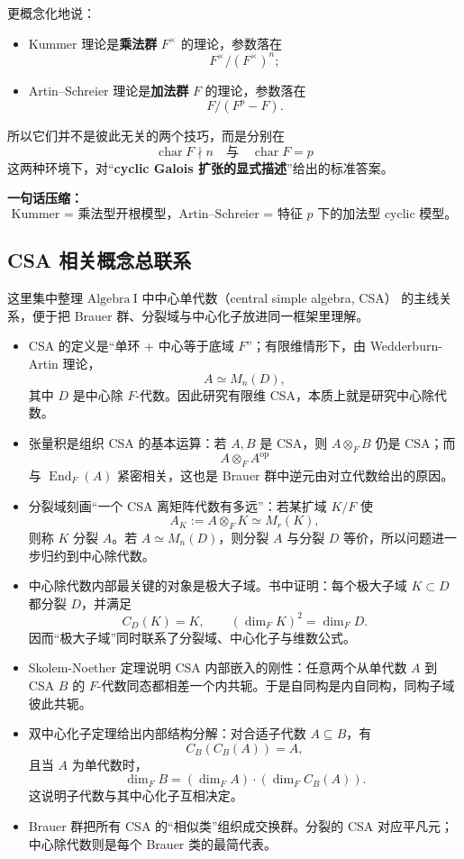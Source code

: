\documentclass[a4paper]{ctexart}
\theoremstyle{definition}
\theoremstyle{analysis}
\theoremstyle{plain}
\begin{document}
更概念化地说：
\begin{itemize}
  \item Kummer 理论是\textbf{乘法群} \(F^\times\) 的理论，参数落在
  \[
    F^\times/(F^\times)^n;
  \]
  \item Artin--Schreier 理论是\textbf{加法群} \(F\) 的理论，参数落在
  \[
    F/(F^p-F).
  \]
\end{itemize}

所以它们并不是彼此无关的两个技巧，而是分别在
\[
  \operatorname{char}F\nmid n
  \quad\text{与}\quad
  \operatorname{char}F=p
\]
这两种环境下，对“\textbf{cyclic Galois 扩张的显式描述}”给出的标准答案。

\medskip

\textbf{一句话压缩：}
\[
  \boxed{
    \text{Kummer = 乘法型开根模型，Artin--Schreier = 特征 }p\text{ 下的加法型 cyclic 模型。}
  }
\]

\subsection{CSA 相关概念总联系}\label{subsec:topic-csa}

这里集中整理 \( \mathrm{Algebra\ I} \) 中中心单代数（central simple algebra, CSA）
的主线关系，便于把 Brauer 群、分裂域与中心化子放进同一框架里理解。

\begin{itemize}
  \item CSA 的定义是“单环 + 中心等于底域 \(F\)”；有限维情形下，由 Wedderburn-Artin 理论，
  \[
    A\simeq M_n(D),
  \]
  其中 \(D\) 是中心除 \(F\)-代数。因此研究有限维 CSA，本质上就是研究中心除代数。
  \item 张量积是组织 CSA 的基本运算：若 \(A,B\) 是 CSA，则 \(A\otimes_F B\) 仍是 CSA；而
  \[
    A\otimes_F A^{\mathrm{op}}
  \]
  与 \(\operatorname{End}_F(A)\) 紧密相关，这也是 Brauer 群中逆元由对立代数给出的原因。
  \item 分裂域刻画“一个 CSA 离矩阵代数有多远”：若某扩域 \(K/F\) 使
  \[
    A_K:=A\otimes_F K \simeq M_r(K),
  \]
  则称 \(K\) 分裂 \(A\)。若 \(A\simeq M_n(D)\)，则分裂 \(A\) 与分裂 \(D\) 等价，所以问题进一步归约到中心除代数。
  \item 中心除代数内部最关键的对象是极大子域。书中证明：每个极大子域 \(K\subset D\) 都分裂 \(D\)，并满足
  \[
    C_D(K)=K,
    \qquad
    (\dim_F K)^2=\dim_F D.
  \]
  因而“极大子域”同时联系了分裂域、中心化子与维数公式。
  \item Skolem-Noether 定理说明 CSA 内部嵌入的刚性：任意两个从单代数 \(A\) 到 CSA \(B\) 的
  \(F\)-代数同态都相差一个内共轭。于是自同构是内自同构，同构子域彼此共轭。
  \item 双中心化子定理给出内部结构分解：对合适子代数 \(A\subseteq B\)，有
  \[
    C_B(C_B(A))=A,
  \]
  且当 \(A\) 为单代数时，
  \[
    \dim_F B = (\dim_F A)\cdot (\dim_F C_B(A)).
  \]
  这说明子代数与其中心化子互相决定。
  \item Brauer 群把所有 CSA 的“相似类”组织成交换群。分裂的 CSA 对应平凡元；中心除代数则是每个 Brauer 类的最简代表。
\end{itemize}
\end{document}
